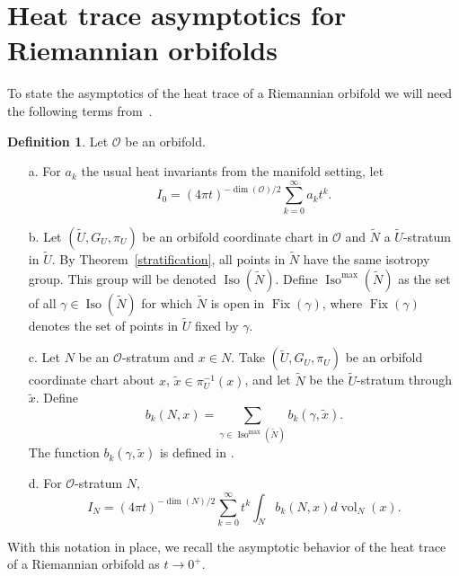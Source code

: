 \documentclass{amsart}
\theoremstyle{plain}
\theoremstyle{definition}
\newtheorem{defn}[thm]{Definition}
\theoremstyle{remark}
\newcommand{\wtu}{\widetilde{U}}
\newcommand{\orb}{\mathcal O}
\DeclareMathOperator{\iso}{Iso}
\DeclareMathOperator{\fix}{Fix}
\DeclareMathOperator{\vol}{vol}
\begin{document}
\section{Heat trace asymptotics for Riemannian orbifolds}

To state the asymptotics of the heat trace of a Riemannian orbifold we will
need the following terms from~\cite{dggw}.

\begin{defn} Let $\orb$ be an orbifold.
\begin{itemize}
\item[a.] For $a_k$ the usual heat invariants from the manifold setting, let $$I_0=(4\pi t)^{-\dim(\orb)/2} \sum_{k=0}^\infty a_k t^k.$$ 
\item[b.] Let  $(\widetilde{U}, G_U, \pi_U)$ be an orbifold coordinate chart in $\orb$ and $\widetilde{N}$ a $\wtu$-stratum in $\wtu$. By Theorem~\ref{stratification}, all points in $\widetilde{N}$ have the same isotropy group.  This group will be denoted $\iso(\widetilde{N})$.  Define $\iso^{\max}(\widetilde{N})$ as the set of all $\gamma \in \iso(\widetilde{N})$ for which $\widetilde{N}$ is open in $\fix(\gamma)$, where $\fix(\gamma)$ denotes the set of points in $\wtu$ fixed by $\gamma$.
\item[c.] Let $N$ be an $\orb$-stratum and $x\in N$.  Take $(\widetilde{U}, G_U, \pi_U)$ be an orbifold coordinate chart about $x$, $\tilde x \in \pi_U^{-1}(x)$, and let $\widetilde{N}$ be the $\widetilde{U}$-stratum through $\tilde x$.  Define
 \[b_k(N,x) = \sum_{\gamma \in \iso^{\max}(\widetilde{N})} b_k(\gamma,\tilde{x}).\]
 The function $b_k(\gamma,\tilde{x})$ is defined in \cite[Section 4.2]{dggw}.
\item[d.] For $\orb$-stratum $N$, $$I_N=(4\pi t)^{-\dim(N)/2}\sum_{k=0}^\infty t^k \int_N b_k(N,x) d\vol_N(x).$$
\end{itemize}
\end{defn}

With this notation in place, we recall the asymptotic behavior of the heat trace of a Riemannian orbifold as $t\rightarrow 0^+$.
\end{document}
